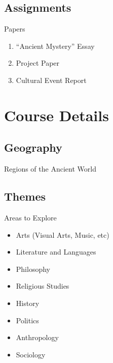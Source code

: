 

\subsection{Assignments}
\begin{frame}{Papers}
	\begin{enumerate}
		\item<1->``Ancient Mystery'' Essay
		\item<2->Project Paper
		\item<3->Cultural Event Report
	\end{enumerate}
\end{frame}

\section{Course Details}
\subsection{Geography}
\begin{frame}{Regions of the Ancient World}
\end{frame}

\subsection{Themes}
\begin{frame}{Areas to Explore}
	\begin{itemize}
		\item<1->Arts (Visual Arts, Music, etc)
		\item<2->Literature and Languages
		\item<3->Philosophy
		\item<4->Religious Studies
		\item<5->History
		\item<5->Politics
		\item<6->Anthropology
		\item<6->Sociology
	\end{itemize}
\end{frame}

\timeout